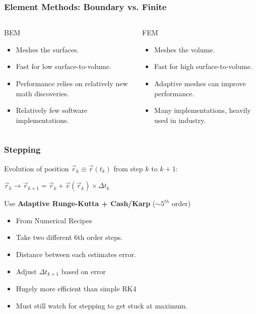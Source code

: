 \documentclass[xcolor=dvipsnames]{beamer}
\begin{document}
\begin{frame}
  \frametitle{Element Methods: Boundary vs. Finite}
  \begin{columns}
    \begin{column}{0.5\textwidth}
      BEM
      \begin{itemize}
      \item Meshes the surfaces.
      \item Fast for low surface-to-volume.
      \item Performance relies on relatively new math discoveries.
      \item Relatively few software implementations.
      \end{itemize}      
    \end{column}
    \begin{column}{0.5\textwidth}
      FEM
      \begin{itemize}
      \item Meshes the volume.
      \item Fast for high surface-to-volume.
      \item Adaptive meshes can improve performance.
      \item Many implementations, heavily used in industry.
      \end{itemize}      
    \end{column}
  \end{columns}
\end{frame}

\begin{frame}
  \frametitle{Stepping}
  Evolution of position $\vec{r}_k \equiv \vec{r}(t_k)$ from step $k$ to $k+1$:
  \begin{center}
    $\vec{r}_k \rightarrow \vec{r}_{k+1} = \vec{r}_k + \vec{v}(\vec{r}_k) \times \Delta t_k$
  \end{center}
  Use \textbf{Adaptive Runge-Kutta + Cash/Karp} ($\sim 5^{th}$ order)
  \begin{itemize}
  \item From Numerical Recipes
  \item Take two different 6th order steps.
  \item Distance between each estimates error.
  \item Adjust $\Delta t_{k+1}$ based on error
  \item Hugely more efficient than simple RK4
  \item Must still watch for stepping to get stuck at maximum.
  \end{itemize}
\end{frame}
\end{document}
